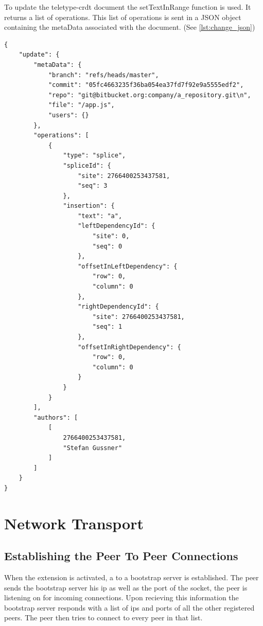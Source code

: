 To update the teletype-crdt document the setTextInRange function is used. It returns a list of operations. This list of operations is sent in a JSON object containing the metaData associated with the document. (See \autoref{lst:change_json})

\begin{lstlisting}[label={lst:change_json}, caption=Network Data Packet]
{
    "update": {
        "metaData": {
            "branch": "refs/heads/master",
            "commit": "05fc4663235f36ba054ea37fd7f92e9a5555edf2",
            "repo": "git@bitbucket.org:company/a_repository.git\n",
            "file": "/app.js",
            "users": {}
        },
        "operations": [
            {
                "type": "splice",
                "spliceId": {
                    "site": 2766400253437581,
                    "seq": 3
                },
                "insertion": {
                    "text": "a",
                    "leftDependencyId": {
                        "site": 0,
                        "seq": 0
                    },
                    "offsetInLeftDependency": {
                        "row": 0,
                        "column": 0
                    },
                    "rightDependencyId": {
                        "site": 2766400253437581,
                        "seq": 1
                    },
                    "offsetInRightDependency": {
                        "row": 0,
                        "column": 0
                    }
                }
            }
        ],
        "authors": [
            [
                2766400253437581,
                "Stefan Gussner"
            ]
        ]
    }
}
\end{lstlisting}

\section{Network Transport}

\subsection{Establishing the Peer To Peer Connections}
When the extension is activated, a to a bootstrap server is established. 
The peer sends the bootstrap server his ip as well as the port of the socket, the peer is listening on for incoming connections.
Upon recieving this information the bootstrap server responds with a list of ips and ports of all the other registered peers.
The peer then tries to connect to every peer in that list.

